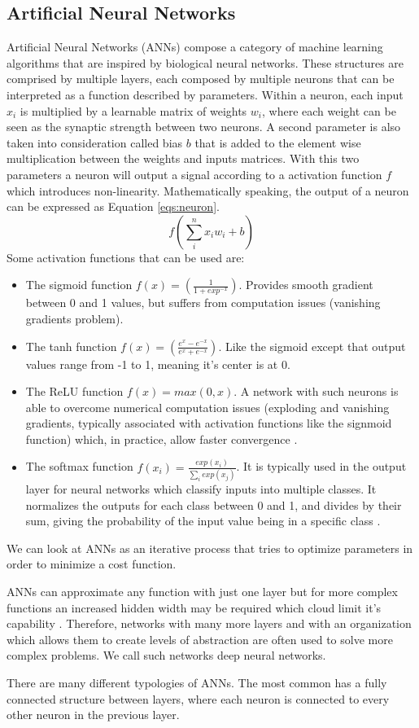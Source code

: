 \subsection{Artificial Neural Networks}
Artificial Neural Networks (\ac{ANN}s) compose a category of machine learning algorithms that are inspired by biological neural networks. These structures are comprised by multiple layers, each composed by multiple neurons that can be interpreted as a function described by parameters.
Within a neuron, each input $x_i$ is multiplied by a learnable matrix of weights $w_i$, where each weight can be seen as the synaptic strength between two neurons. A second parameter is also taken into consideration called bias $b$ that is added to the element wise multiplication between the weights and inputs matrices.  With this two parameters a neuron will output a signal according to a activation function $f$ which introduces non-linearity. Mathematically speaking, the output of a neuron can be expressed as Equation \ref{eqs:neuron}.
\begin{equation}
    f(\sum_{i}^{n} x_i w_i + b)
    \label{eqs:neuron}
\end{equation}
Some activation functions that can be used are:
\begin{itemize}
    \item The sigmoid function $f(x) = (\frac{1}{1+exp^{-x}})$. Provides smooth gradient between 0 and 1 values, but suffers from computation issues (vanishing gradients problem).
    \item The tanh function $f(x) = (\frac{e^x - e^{-x}}{e^x + e^{-x}}) $. Like the sigmoid except that output values range from -1 to 1, meaning it's center is at 0.  
    \item The ReLU function $f(x) = max(0, x)$. A network with such neurons is able to overcome numerical computation issues (exploding and vanishing gradients, typically associated with activation functions like the signmoid function) which, in practice, allow faster convergence \cite{?}.
    \item The softmax function $f(x_i) = \frac{exp(x_i)}{\sum_{i}^{} exp(x_j)}$. It is typically used in the output layer for neural networks which classify inputs into multiple classes. It normalizes the outputs for each class between 0 and 1, and divides by their sum, giving the probability of the input value being in a specific class \cite{?}.
\end{itemize}

We can look at \ac{ANN}s as an iterative process that tries to optimize parameters in order to minimize a cost function. \par
\ac{ANN}s can approximate any function with just one layer but for more complex functions an increased hidden width may be required which cloud limit it's capability \cite{?}. Therefore, networks with many more layers and with an organization which allows them to create levels of abstraction are often used to solve more complex problems. We call such networks deep neural networks. \par
There are many different typologies of \ac{ANN}s. The most common has a fully connected structure between layers, where each neuron is connected to every other neuron in the previous layer. 

